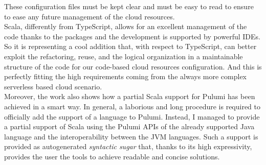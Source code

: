 These configuration files must be kept clear and must be easy to read to ensure to ease any future management of the cloud resources.\\
Scala, differently from TypeScript, allows for an excellent management of the code thanks to the packages and the development is supported by powerful IDEs.
So it is representing a cool addition that, with respect to TypeScript, can better exploit the refactoring, reuse, and the logical organization in a maintainable structure of the code for our code-based cloud resources configuration.
And this is perfectly fitting the high requirements coming from the always more complex serverless based cloud scenario.\\
Moreover, the work also shows how a partial Scala support for Pulumi has been achieved in a smart way.
In general, a laborious and long procedure is required to officially add the support of a language to Pulumi.
Instead, I managed to provide a partial support of Scala using the Pulumi APIs of the already supported Java language and the interoperability between the JVM languages.
Such a support is provided as autogenerated \textit{syntactic sugar} that, thanks to its high expressivity, provides the user the tools to achieve readable and concise solutions.





